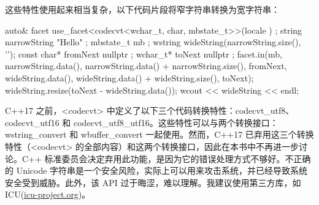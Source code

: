 这些特性使用起来相当复杂，以下代码片段将窄字符串转换为宽字符串：

\begin{cpp}
auto& facet { use_facet<codecvt<wchar_t, char, mbstate_t>>(locale { }) };
string narrowString { "Hello" };
mbstate_t mb { };
wstring wideString(narrowString.size(), '\0');
const char* fromNext { nullptr };
wchar_t* toNext { nullptr };
facet.in(mb,
    narrowString.data(), narrowString.data() + narrowString.size(), fromNext,
    wideString.data(), wideString.data() + wideString.size(), toNext);
wideString.resize(toNext - wideString.data());
wcout << wideString << endl;
\end{cpp}

C++17 之前，<codecvt> 中定义了以下三个代码转换特性：codecvt\_utf8、codecvt\_utf16 和 codecvt\_utf8\_utf16。这些特性可以与两个转换接口：wstring\_convert 和 wbuffer\_convert 一起使用。然而，C++17 已弃用这三个转换特性（<codecvt> 的全部内容）和这两个转换接口，因此在本书中不再进一步讨论。C++ 标准委员会决定弃用此功能，是因为它的错误处理方式不够好。不正确的 Unicode 字符串是一个安全风险，实际上可以用来攻击系统，并已经导致系统安全受到威胁。此外，该 API 过于晦涩，难以理解。我建议使用第三方库，如 ICU(\url{icu-project.org})。













